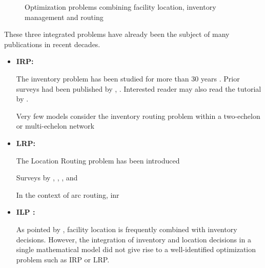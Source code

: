 \documentclass[a4paper,10pt]{article}
\begin{document}
\begin{linenumbers}
\begin{figure}[htbp]
	\caption{Optimization problems combining facility location, inventory management and routing}
	\label{fig:circles}
	\end{figure} 

These three integrated problems have already been the subject of many publications in recent decades.

\begin{itemize}
	
	\item \textbf{IRP: }
	
	The inventory problem has been studied for more than 30 years \citep{Coelho2014}. Prior surveys had been published by \cite{Campbell98}, \cite{MoinSalhi2007}. Interested reader may also read the tutorial by \cite{Bertazzi2012}. 
	
	Very few models consider the inventory routing problem within a two-echelon or multi-echelon network	\citep{GuimaraesCoelho2019}
	
	\item \textbf{LRP: }
	
	The Location Routing problem has been introduced 
	
		
	
	\cite{Laporte1987} 
	
	Surveys by \cite{MinJS98}, \cite{NagySahli07}, \cite{ProdhonPrins2014}, \cite{DrexlSchneider2015} and \cite{Schneider2017} 
	
	
	
In the context of arc routing, 	\cite{Riquelme2016} inr

	
	
	\item \textbf{ILP : }
	
	As pointed by \cite{Melo2009}, facility location is frequently combined with inventory decisions. However, the integration of inventory and location decisions in a single mathematical model did not give rise to a well-identified optimization problem such as IRP or LRP. 
	
	
\end{itemize}


\end{linenumbers}
\end{document}
